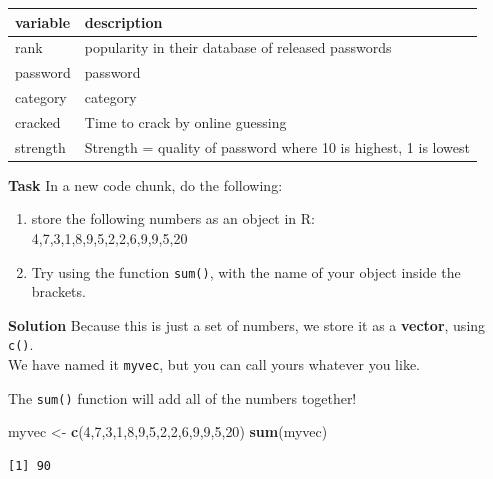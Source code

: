 \documentclass[]{book}
\newenvironment{Shaded}{\begin{snugshade}}{\end{snugshade}}
\newcommand{\DecValTok}[1]{\textcolor[rgb]{0.00,0.00,0.81}{#1}}
\newcommand{\KeywordTok}[1]{\textcolor[rgb]{0.13,0.29,0.53}{\textbf{#1}}}
\newcommand{\NormalTok}[1]{#1}
\newcommand{\StringTok}[1]{\textcolor[rgb]{0.31,0.60,0.02}{#1}}
\providecommand{\tightlist}{%
  \setlength{\itemsep}{0pt}\setlength{\parskip}{0pt}}
\begin{document}
\begin{tabular}{l|l}
\hline
variable & description\\
\hline
rank & popularity in their database of released passwords\\
\hline
password & password\\
\hline
category & category\\
\hline
cracked & Time to crack by online guessing\\
\hline
strength & Strength = quality of password where 10 is highest, 1 is lowest\\
\hline
\end{tabular}

\textbf{Task}
In a new code chunk, do the following:

\begin{enumerate}
\def\labelenumi{\arabic{enumi}.}
\tightlist
\item
  store the following numbers as an object in R:\\
  4,7,3,1,8,9,5,2,2,6,9,9,5,20\\
\item
  Try using the function \texttt{sum()}, with the name of your object inside the brackets.
\end{enumerate}

\textbf{Solution }
Because this is just a set of numbers, we store it as a \textbf{vector}, using \texttt{c()}.\\
We have named it \texttt{myvec}, but you can call yours whatever you like.

The \texttt{sum()} function will add all of the numbers together!

\begin{Shaded}
\begin{Highlighting}[]
\NormalTok{myvec <-}\StringTok{ }\KeywordTok{c}\NormalTok{(}\DecValTok{4}\NormalTok{,}\DecValTok{7}\NormalTok{,}\DecValTok{3}\NormalTok{,}\DecValTok{1}\NormalTok{,}\DecValTok{8}\NormalTok{,}\DecValTok{9}\NormalTok{,}\DecValTok{5}\NormalTok{,}\DecValTok{2}\NormalTok{,}\DecValTok{2}\NormalTok{,}\DecValTok{6}\NormalTok{,}\DecValTok{9}\NormalTok{,}\DecValTok{9}\NormalTok{,}\DecValTok{5}\NormalTok{,}\DecValTok{20}\NormalTok{)}
\KeywordTok{sum}\NormalTok{(myvec)}
\end{Highlighting}
\end{Shaded}

\begin{verbatim}
[1] 90
\end{verbatim}
\end{document}

